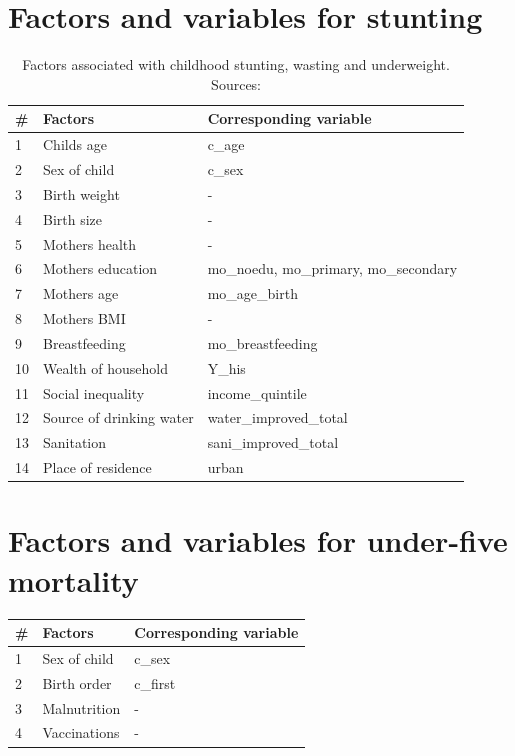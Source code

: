 \documentclass[a4paper, 11pt]{article} %
\begin{document}

\newpage
\begin{appendices}
\section{Factors and variables for stunting} \label{sec:appendixa}
\begin{table}[h!]
\begin{tabular}{@{}lll@{}}
\toprule
\# & \textbf{Factors} & \textbf{Corresponding variable} \\ \midrule
1 & Childs age & c\_age \\
2 & Sex of child & c\_sex  \\
3 & Birth weight & -  \\
4 & Birth size & - \\ \midrule

5 & Mothers health & - \\
6 & Mothers education & mo\_noedu, mo\_primary, mo\_secondary \\
7 & Mothers age  & mo\_age\_birth \\
8 & Mothers BMI & - \\
9 & Breastfeeding & mo\_breastfeeding \\ \midrule

10 & Wealth of household & Y\_his  \\
11 & Social inequality & income\_quintile \\
12 & Source of drinking water & water\_improved\_total  \\
13 & Sanitation &  sani\_improved\_total  \\
14 & Place of residence & urban  \\ \bottomrule
\end{tabular}
    \caption{Factors associated with childhood stunting, wasting and underweight. Sources: \cite{Akombi2017Aug} \cite{UNI18}}
    \label{table:stunting}
\end{table}

\newpage
\section{Factors and variables for under-five mortality} \label{sec:appendixb}
\begin{table}[h!]
\begin{tabular}{@{}lll@{}}
\toprule
\# & \textbf{Factors} & \textbf{Corresponding variable} \\ \midrule
1 & Sex of child & c\_sex  \\
2 & Birth order & c\_first  \\ 
3 & Malnutrition & - \\ 
4 & Vaccinations & - \\ \midrule


\end{tabular}
\end{table}
\end{appendices}
\end{document}

